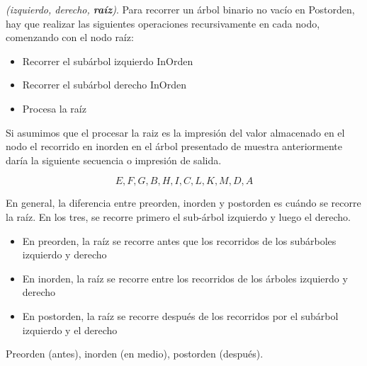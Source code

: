 \emph{(izquierdo, derecho, \textbf{raíz})}. Para recorrer un árbol binario no vacío en Postorden, hay que realizar
las siguientes operaciones recursivamente en cada nodo, comenzando con el nodo raíz:

\begin{itemize}
	\item Recorrer el subárbol izquierdo InOrden
	\item Recorrer el subárbol derecho InOrden
	\item Procesa la raíz
\end{itemize}

Si asumimos que el procesar la raiz es la impresión del valor almacenado en el nodo el recorrido en inorden en el árbol presentado de muestra anteriormente daría la siguiente secuencia o impresión de salida.

$$ E,F,G,B,H,I,C,L,K,M,D,A $$

En general, la diferencia entre preorden, inorden y postorden es cuándo se recorre la raíz. En los tres, se recorre primero el sub-árbol izquierdo y luego el derecho. 

\begin{itemize}
	\item En preorden, la raíz se recorre antes que los recorridos de los subárboles izquierdo y derecho
	\item En inorden, la raíz se recorre entre los recorridos de los árboles izquierdo y derecho
	\item En postorden, la raíz se recorre después de los recorridos por el subárbol izquierdo y el derecho
\end{itemize}

Preorden (antes), inorden (en medio), postorden (después). 